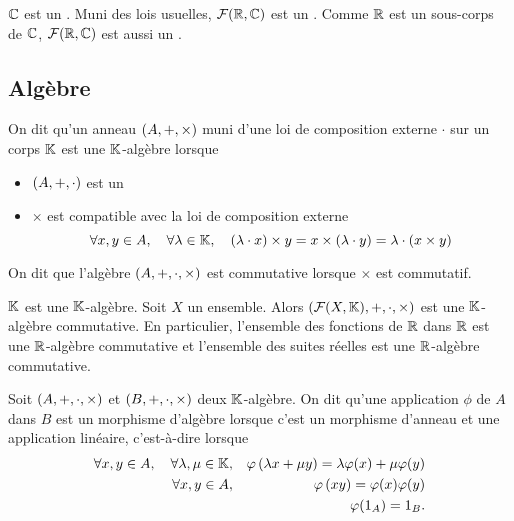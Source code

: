 \documentclass{magnolia}
\begin{document}
\begin{remarques}
\remarque[utile=-2] $\mathbb{C}$ est un \Rev.
\remarque[utile=-1] Muni des lois usuelles, $\mathcal{F}(\mathbb{R},\mathbb{C})$ est un \Cev.
  Comme $\mathbb{R}$ est un sous-corps de $\mathbb{C}$, $\mathcal{F}(\mathbb{R},\mathbb{C})$ est aussi un \Rev.
\end{remarques}


\subsection{Algèbre}

\begin{definition}
On dit qu'un anneau $\left(A,+,\times\right)$ muni d'une loi de composition externe
$\cdot$ sur un corps $\mathbb{K}$ est une $\mathbb{K}$-algèbre lorsque
\begin{itemize}
\item $\left(A,+,\cdot\right)$ est un \Kev
\item $\times$ est compatible avec la loi de composition externe
  \[\forall x,y\in A ,\quad \forall \lambda\in\mathbb{K} ,\quad
    \left(\lambda\cdot x\right)\times y=x\times\left(\lambda\cdot y\right)=
     \lambda\cdot\left(x\times y\right)\]
\end{itemize}
On dit que l'algèbre $\left(A,+,\cdot,\times\right)$ est commutative lorsque $\times$
est commutatif.
\end{definition}

\begin{exemples}
\exemple $\mathbb{K}$ est une $\mathbb{K}$-algèbre.
\exemple Soit $X$ un ensemble. Alors $(\mathcal{F}(X,\mathbb{K}),+,\cdot,\times)$ est une $\mathbb{K}$-algèbre commutative. En particulier, l'ensemble des fonctions de $\mathbb{R}$ dans $\mathbb{R}$ est
une $\mathbb{R}$-algèbre commutative et l'ensemble des suites réelles est une $\mathbb{R}$-algèbre
commutative.
\end{exemples}

\begin{definition}
Soit $\left(A,+,\cdot,\times\right)$ et $\left(B,+,\cdot,\times\right)$ deux $\mathbb{K}$-algèbre. On dit qu'une application $\phi$ de $A$ dans $B$ est un morphisme d'algèbre lorsque c'est un morphisme
d'anneau et une application linéaire, c'est-à-dire lorsque
\begin{eqnarray*}
  \forall x,y\in A ,\quad \forall \lambda,\mu\in\mathbb{K}, & &
    \varphi\left(\lambda x+\mu y\right)=\lambda \varphi(x)+\mu \varphi(y)\\
  \forall x,y\in A, & &
    \varphi\left(xy\right)=\varphi(x)\varphi(y)\\
  & & \varphi(1_A)=1_B.
  \end{eqnarray*}
\end{definition}
\end{document}
